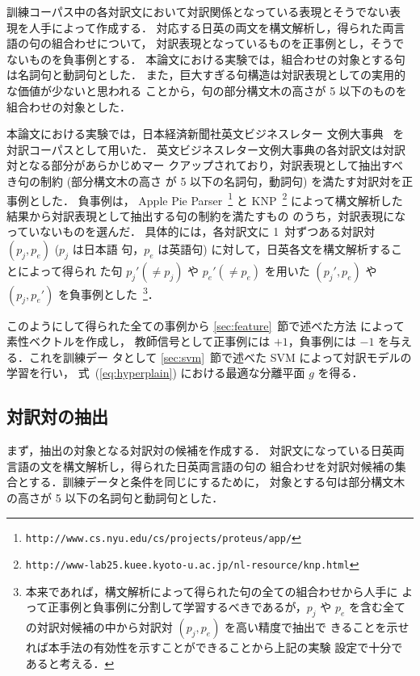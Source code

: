 訓練コーパス中の各対訳文において対訳関係となっている表現とそうでない表
現を人手によって作成する．
対応する日英の両文を構文解析し，得られた両言語の句の組合わせについて，
対訳表現となっているものを正事例とし，そうでないものを負事例とする．
本論文における実験では，組合わせの対象とする句は名詞句と動詞句とした．
また，巨大すぎる句構造は対訳表現としての実用的な価値が少ないと思われる
ことから，句の部分構文木の高さが 5 以下のものを組合わせの対象とした．

本論文における実験では，日本経済新聞社英文ビジネスレター
文例大事典~\cite{nikkei_business_corpus} を対訳コーパスとして用いた．
英文ビジネスレター文例大事典の各対訳文は対訳対となる部分があらかじめマー
クアップされており，対訳表現として抽出すべき句の制約 (部分構文木の高さ
が 5 以下の名詞句，動詞句) を満たす対訳対を正事例とした．
負事例は，
Apple Pie Parser~\footnote{{\tt http://www.cs.nyu.edu/cs/projects/proteus/app/}}
と
KNP~\footnote{{\tt http://www-lab25.kuee.kyoto-u.ac.jp/nl-resource/knp.html}}
によって構文解析した結果から対訳表現として抽出する句の制約を満たすもの
のうち，対訳表現になっていないものを選んだ．
具体的には，各対訳文に 1~対ずつある対訳対 $(p_j, p_e)$ ($p_j$ は日本語
句，$p_e$ は英語句) に対して，日英各文を構文解析することによって得られ
た句 $p_j' (\neq p_j)$ や $p_e' (\neq p_e)$ を用いた $(p_j', p_e)$ や
$(p_j, p_e')$ を負事例とした~\footnote{
  本来であれば，構文解析によって得られた句の全ての組合わせから人手に
  よって正事例と負事例に分割して学習するべきであるが，$p_j$ や $p_e$
  を含む全ての対訳対候補の中から対訳対 $(p_j, p_e)$ を高い精度で抽出で
  きることを示せれば本手法の有効性を示すことができることから上記の実験
  設定で十分であると考える．}．

このようにして得られた全ての事例から \ref{sec:feature}~節で述べた方法
によって素性ベクトルを作成し，
教師信号として正事例には $+1$，負事例には $-1$ を与える．これを訓練デー
タとして \ref{sec:svm}~節で述べた SVM によって対訳モデルの学習を行い，
式~(\ref{eq:hyperplain}) における最適な分離平面 $g$ を得る．

\subsection{対訳対の抽出}
\label{sec:extraction}

まず，抽出の対象となる対訳対の候補を作成する．
対訳文になっている日英両言語の文を構文解析し，得られた日英両言語の句の
組合わせを対訳対候補の集合とする．訓練データと条件を同じにするために，
対象とする句は部分構文木の高さが 5 以下の名詞句と動詞句とした．

